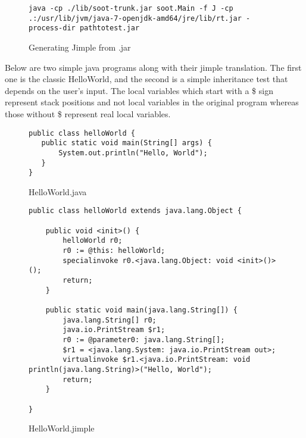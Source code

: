 \documentclass{dithesis}
\begin{document}
        \begin{figure}[H]
\begin{lstlisting}
java -cp ./lib/soot-trunk.jar soot.Main -f J -cp .:/usr/lib/jvm/java-7-openjdk-amd64/jre/lib/rt.jar -process-dir pathtotest.jar
\end{lstlisting}
        \caption{Generating Jimple from .jar}
        \end{figure}

        Below are two simple java programs along with their jimple translation. The first one is the classic HelloWorld, and the second is a simple inheritance test that depends on the user's input.
       	The local variables which start with a \$ sign represent stack positions and not local variables in the original program whereas those without \$ represent real local variables.
            \begin{figure}[H]
\begin{lstlisting}
public class helloWorld {
   public static void main(String[] args) {
       System.out.println("Hello, World");
   }
}
\end{lstlisting}
            \caption{HelloWorld.java}
            \end{figure}
            \begin{figure}[H]
\begin{lstlisting}
public class helloWorld extends java.lang.Object {

    public void <init>() {
        helloWorld r0;
        r0 := @this: helloWorld;
        specialinvoke r0.<java.lang.Object: void <init>()>();
        return;
    }

    public static void main(java.lang.String[]) {
        java.lang.String[] r0;
        java.io.PrintStream $r1;
        r0 := @parameter0: java.lang.String[];
        $r1 = <java.lang.System: java.io.PrintStream out>;
        virtualinvoke $r1.<java.io.PrintStream: void println(java.lang.String)>("Hello, World");
        return;
    }

}
\end{lstlisting}
            \caption{HelloWorld.jimple}
            \end{figure}
\end{document}
